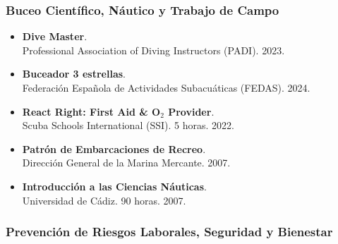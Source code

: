 \documentclass[11pt,a4paper]{article}
\begin{document}
\subsubsection{Buceo Científico, Náutico y Trabajo de Campo}

\begin{itemize}[leftmargin=*]
    \item \textbf{Dive Master}.\\
    Professional Association of Diving Instructors (PADI). 2023.

    \item \textbf{Buceador 3 estrellas}.\\
    Federación Española de Actividades Subacuáticas (FEDAS). 2024.

    \item \textbf{React Right: First Aid \& O$_2$ Provider}.\\
    Scuba Schools International (SSI). 5 horas. 2022.

    \item \textbf{Patrón de Embarcaciones de Recreo}.\\
    Dirección General de la Marina Mercante. 2007.

    \item \textbf{Introducción a las Ciencias Náuticas}.\\
    Universidad de Cádiz. 90 horas. 2007.
\end{itemize}

\subsubsection{Prevención de Riesgos Laborales, Seguridad y Bienestar}
\end{document}
